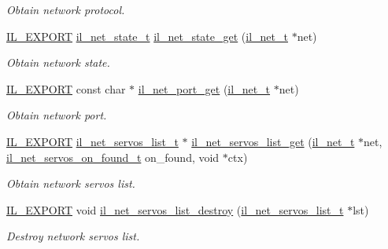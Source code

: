 \begin{DoxyCompactItemize}
\begin{DoxyCompactList}\small\item\em Obtain network protocol. \end{DoxyCompactList}\item 
\hyperlink{common_8h_a6bb629d26c52bfe10519ba3176853f47}{I\+L\+\_\+\+E\+X\+P\+O\+RT} \hyperlink{group__IL__NET_ga0391fec0328dc9cfd7b91990998930a7}{il\+\_\+net\+\_\+state\+\_\+t} \hyperlink{group__IL__NET_ga83bb157bace16b18f1ebba59a6c6fe59}{il\+\_\+net\+\_\+state\+\_\+get} (\hyperlink{group__IL__NET_ga0657204ab779a5b7a504aa0b895d1ae6}{il\+\_\+net\+\_\+t} $\ast$net)
\begin{DoxyCompactList}\small\item\em Obtain network state. \end{DoxyCompactList}\item 
\hyperlink{common_8h_a6bb629d26c52bfe10519ba3176853f47}{I\+L\+\_\+\+E\+X\+P\+O\+RT} const char $\ast$ \hyperlink{group__IL__NET_ga307f630cca0e1d5e1ff44ce04abc9389}{il\+\_\+net\+\_\+port\+\_\+get} (\hyperlink{group__IL__NET_ga0657204ab779a5b7a504aa0b895d1ae6}{il\+\_\+net\+\_\+t} $\ast$net)
\begin{DoxyCompactList}\small\item\em Obtain network port. \end{DoxyCompactList}\item 
\hyperlink{common_8h_a6bb629d26c52bfe10519ba3176853f47}{I\+L\+\_\+\+E\+X\+P\+O\+RT} \hyperlink{group__IL__NET_ga81660630b147245b0a160f13ef465811}{il\+\_\+net\+\_\+servos\+\_\+list\+\_\+t} $\ast$ \hyperlink{group__IL__NET_ga6167fb50406d818120a069b681d377df}{il\+\_\+net\+\_\+servos\+\_\+list\+\_\+get} (\hyperlink{group__IL__NET_ga0657204ab779a5b7a504aa0b895d1ae6}{il\+\_\+net\+\_\+t} $\ast$net, \hyperlink{group__IL__NET_ga4ba09545bd04fa6df4f0a26f14df84f7}{il\+\_\+net\+\_\+servos\+\_\+on\+\_\+found\+\_\+t} on\+\_\+found, void $\ast$ctx)
\begin{DoxyCompactList}\small\item\em Obtain network servos list. \end{DoxyCompactList}\item 
\hyperlink{common_8h_a6bb629d26c52bfe10519ba3176853f47}{I\+L\+\_\+\+E\+X\+P\+O\+RT} void \hyperlink{group__IL__NET_ga7bb08347585c3760ba2f0c471c478d12}{il\+\_\+net\+\_\+servos\+\_\+list\+\_\+destroy} (\hyperlink{group__IL__NET_ga81660630b147245b0a160f13ef465811}{il\+\_\+net\+\_\+servos\+\_\+list\+\_\+t} $\ast$lst)
\begin{DoxyCompactList}\small\item\em Destroy network servos list. \end{DoxyCompactList}\item 

\end{DoxyCompactItemize}
